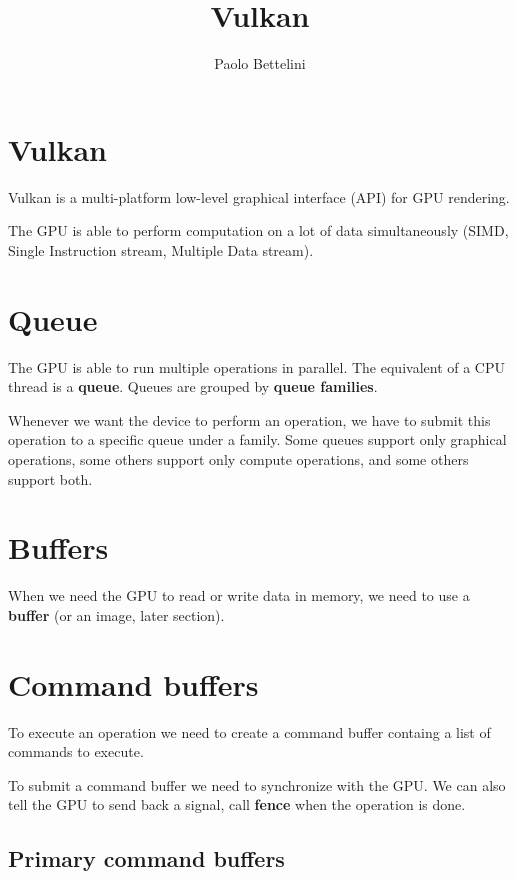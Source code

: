 \documentclass{article}
\title{Vulkan}
\author{Paolo Bettelini}
\date{}
\begin{document}
\maketitle
\tableofcontents
\pagebreak

\section{Vulkan}

Vulkan is a multi-platform low-level graphical interface (API)
for GPU rendering.

The GPU is able to perform computation on a lot of data simultaneously
(SIMD, Single Instruction stream, Multiple Data stream).

\section{Queue}

The GPU is able to run multiple operations in parallel.
The equivalent of a CPU thread is a \textbf{queue}.
Queues are grouped by \textbf{queue families}.

Whenever we want the device to perform an operation,
we have to submit this operation to a specific queue under a family.
Some queues support only graphical operations,
some others support only compute operations, and some others support both.

\section{Buffers}

When we need the GPU to read or write data in memory,
we need to use a \textbf{buffer} (or an image, later section).

\section{Command buffers}

To execute an operation we need to create a command buffer
containg a list of commands to execute.

To submit a command buffer we need to synchronize with the GPU.
We can also tell the GPU to send back a signal, call \textbf{fence} when
the operation is done.

\subsection{Primary command buffers}
\end{document}

